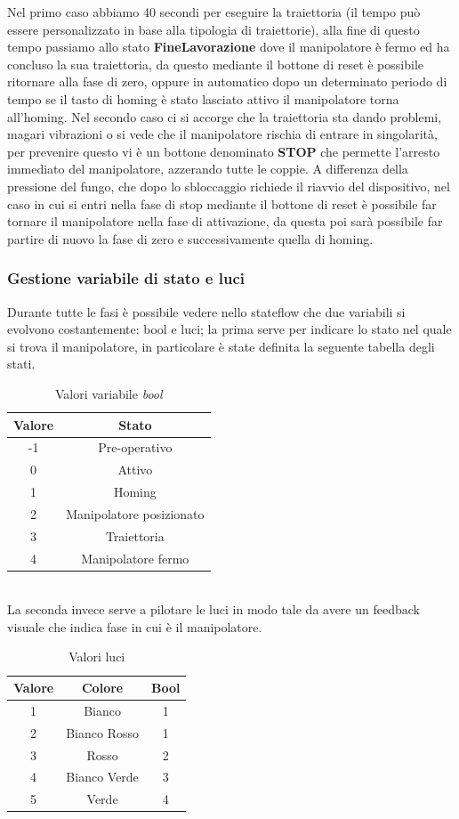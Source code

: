 Nel primo caso abbiamo 40 secondi per eseguire la traiettoria (il tempo può essere personalizzato in base alla tipologia di traiettorie), alla fine di questo tempo passiamo allo stato \textbf{FineLavorazione} dove il manipolatore è fermo ed ha concluso la sua traiettoria, da questo mediante il bottone di reset è possibile ritornare alla fase di zero, oppure in automatico dopo un determinato periodo di tempo se il tasto di homing è stato lasciato attivo il manipolatore torna all'homing. Nel secondo caso ci si accorge che la traiettoria sta dando problemi, magari vibrazioni o si vede che il manipolatore rischia di entrare in singolarità, per prevenire questo vi è un bottone denominato \textbf{STOP} che permette l'arresto immediato del manipolatore, azzerando tutte le coppie. A differenza della pressione del fungo, che dopo lo sbloccaggio richiede il riavvio del dispositivo, nel caso in cui si entri nella fase di stop mediante il bottone di reset è possibile far tornare il manipolatore nella fase di attivazione, da questa poi sarà possibile far partire di nuovo la fase di zero e successivamente quella di homing.

\subsubsection*{Gestione variabile di stato e luci}
Durante tutte le fasi è possibile vedere nello stateflow che due variabili si evolvono costantemente: bool e luci; la prima serve per indicare lo stato nel quale si trova il manipolatore, in particolare è state definita la seguente tabella degli stati.
\begin{table}[h!]
\centering
\begin{tabular}{|c |c |} 
 \hline
 Valore & Stato \\ [0.5ex] 
 \hline\hline
  -1  & Pre-operativo \\ 
  0  & Attivo \\
  1 & Homing \\
  2 & Manipolatore posizionato\\
  3 & Traiettoria\\
  4 & Manipolatore fermo\\
 \hline
\end{tabular}
\caption{Valori variabile \textit{bool}}
\label{table:3}
\end{table}
\\La seconda invece serve a pilotare le luci in modo tale da avere un feedback visuale che indica fase in cui è il manipolatore.
\begin{table}[h!]
\centering
\begin{tabular}{|c |c|c|} 
 \hline
 Valore & Colore & Bool \\ [0.5ex] 
 \hline\hline
  1  & Bianco & 1 \\ 
  2 &  Bianco Rosso & 1\\
  3 &  Rosso & 2 \\
  4 & Bianco Verde & 3\\
  5 & Verde & 4\\
 \hline
\end{tabular}
\caption{Valori luci}
\label{table:luci}
\end{table}
